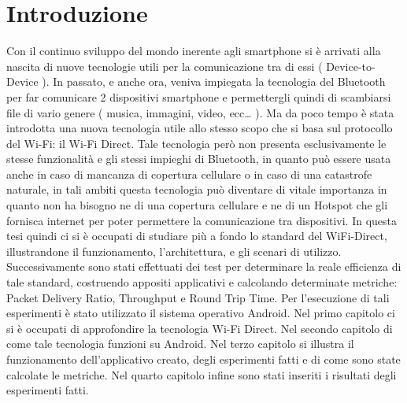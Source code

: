 \chapter*{Introduzione}

Con il continuo sviluppo del mondo inerente agli smartphone si è arrivati alla nascita di nuove tecnologie utili per la comunicazione tra di essi ( Device-to-Device ).
In passato, e anche ora, veniva impiegata la tecnologia del Bluetooth per far comunicare 2 dispositivi smartphone e permettergli quindi di scambiarsi file di vario genere ( musica, immagini, video, ecc… ).
Ma da poco tempo è stata introdotta una nuova tecnologia utile allo stesso scopo che si basa sul protocollo del Wi-Fi: il Wi-Fi Direct.
Tale tecnologia però non presenta esclusivamente le stesse funzionalità e gli stessi impieghi di Bluetooth, in quanto può essere usata anche in caso di mancanza di copertura cellulare o in caso di una catastrofe naturale, in tali ambiti questa tecnologia può diventare di vitale importanza in quanto non ha bisogno ne di una copertura cellulare e ne di un Hotspot che gli fornisca internet per poter permettere la comunicazione tra dispositivi.
In questa tesi quindi ci si è occupati di studiare più a fondo lo standard del WiFi-Direct, illustrandone il funzionamento, l’architettura, e gli scenari di utilizzo.
Successivamente sono stati effettuati dei test per determinare la reale efficienza di tale standard, costruendo appositi applicativi e calcolando determinate metriche: Packet Delivery Ratio, Throughput e Round Trip Time.
Per l’esecuzione di tali esperimenti è stato utilizzato il sistema operativo Android.
Nel primo capitolo ci si è occupati di approfondire la tecnologia Wi-Fi Direct.
Nel secondo capitolo di come tale tecnologia funzioni su Android.
Nel terzo capitolo si illustra il funzionamento dell’applicativo creato, degli esperimenti fatti e di come sono state calcolate le metriche.
Nel quarto capitolo infine sono stati inseriti i risultati degli esperimenti fatti.

